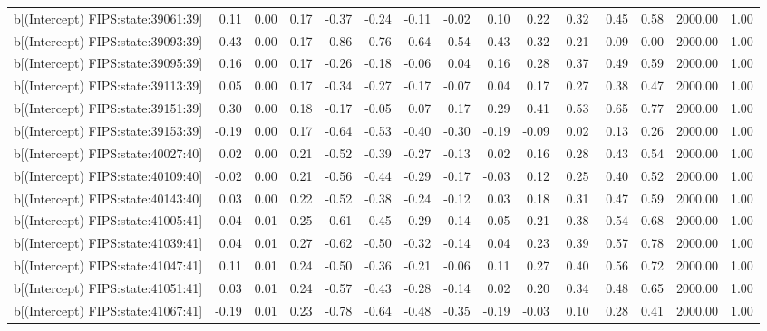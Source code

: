 \begin{table}[ht]
\begin{tabular}{rrrrrrrrrrrrrrr}
  b[(Intercept) FIPS:state:39061:39] & 0.11 & 0.00 & 0.17 & -0.37 & -0.24 & -0.11 & -0.02 & 0.10 & 0.22 & 0.32 & 0.45 & 0.58 & 2000.00 & 1.00 \\ 
  b[(Intercept) FIPS:state:39093:39] & -0.43 & 0.00 & 0.17 & -0.86 & -0.76 & -0.64 & -0.54 & -0.43 & -0.32 & -0.21 & -0.09 & 0.00 & 2000.00 & 1.00 \\ 
  b[(Intercept) FIPS:state:39095:39] & 0.16 & 0.00 & 0.17 & -0.26 & -0.18 & -0.06 & 0.04 & 0.16 & 0.28 & 0.37 & 0.49 & 0.59 & 2000.00 & 1.00 \\ 
  b[(Intercept) FIPS:state:39113:39] & 0.05 & 0.00 & 0.17 & -0.34 & -0.27 & -0.17 & -0.07 & 0.04 & 0.17 & 0.27 & 0.38 & 0.47 & 2000.00 & 1.00 \\ 
  b[(Intercept) FIPS:state:39151:39] & 0.30 & 0.00 & 0.18 & -0.17 & -0.05 & 0.07 & 0.17 & 0.29 & 0.41 & 0.53 & 0.65 & 0.77 & 2000.00 & 1.00 \\ 
  b[(Intercept) FIPS:state:39153:39] & -0.19 & 0.00 & 0.17 & -0.64 & -0.53 & -0.40 & -0.30 & -0.19 & -0.09 & 0.02 & 0.13 & 0.26 & 2000.00 & 1.00 \\ 
  b[(Intercept) FIPS:state:40027:40] & 0.02 & 0.00 & 0.21 & -0.52 & -0.39 & -0.27 & -0.13 & 0.02 & 0.16 & 0.28 & 0.43 & 0.54 & 2000.00 & 1.00 \\ 
  b[(Intercept) FIPS:state:40109:40] & -0.02 & 0.00 & 0.21 & -0.56 & -0.44 & -0.29 & -0.17 & -0.03 & 0.12 & 0.25 & 0.40 & 0.52 & 2000.00 & 1.00 \\ 
  b[(Intercept) FIPS:state:40143:40] & 0.03 & 0.00 & 0.22 & -0.52 & -0.38 & -0.24 & -0.12 & 0.03 & 0.18 & 0.31 & 0.47 & 0.59 & 2000.00 & 1.00 \\ 
  b[(Intercept) FIPS:state:41005:41] & 0.04 & 0.01 & 0.25 & -0.61 & -0.45 & -0.29 & -0.14 & 0.05 & 0.21 & 0.38 & 0.54 & 0.68 & 2000.00 & 1.00 \\ 
  b[(Intercept) FIPS:state:41039:41] & 0.04 & 0.01 & 0.27 & -0.62 & -0.50 & -0.32 & -0.14 & 0.04 & 0.23 & 0.39 & 0.57 & 0.78 & 2000.00 & 1.00 \\ 
  b[(Intercept) FIPS:state:41047:41] & 0.11 & 0.01 & 0.24 & -0.50 & -0.36 & -0.21 & -0.06 & 0.11 & 0.27 & 0.40 & 0.56 & 0.72 & 2000.00 & 1.00 \\ 
  b[(Intercept) FIPS:state:41051:41] & 0.03 & 0.01 & 0.24 & -0.57 & -0.43 & -0.28 & -0.14 & 0.02 & 0.20 & 0.34 & 0.48 & 0.65 & 2000.00 & 1.00 \\ 
  b[(Intercept) FIPS:state:41067:41] & -0.19 & 0.01 & 0.23 & -0.78 & -0.64 & -0.48 & -0.35 & -0.19 & -0.03 & 0.10 & 0.28 & 0.41 & 2000.00 & 1.00 \\ 

\end{tabular}
\end{table}
